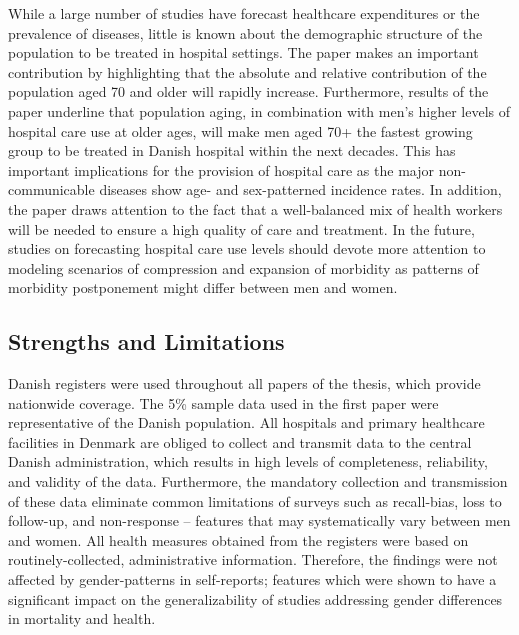 While a large number of studies have forecast healthcare expenditures 
or the prevalence of diseases, little is known about the demographic 
structure of the population to be treated in hospital settings. The 
paper makes an important contribution by highlighting that the absolute 
and relative contribution of the population aged 70 and older will 
rapidly increase. Furthermore, results of the paper underline that 
population aging, in combination with men's higher levels of hospital 
care use at older ages, will make men aged 70+ the fastest 
growing group to be treated in Danish hospital within the next decades. 
This has important implications for the provision of hospital care 
as the major non-communicable diseases show age- and sex-patterned 
incidence rates.\citep{campisi2013aging,leening2014sex,rasmussen2018absolute} 
In addition, the paper draws attention to the fact that a well-balanced 
mix of health workers will be needed to ensure a high quality of 
care and treatment.\citep{hughes2008medical,dall2013aging,darzi2016global,
wilson2018medical} In the future, studies on forecasting hospital care 
use levels should devote more attention to modeling scenarios of 
compression and expansion of morbidity as patterns of morbidity 
postponement might differ between men and women.\citep{fries2011compression}\\




\subsection{Strengths and Limitations}


Danish registers were used throughout all papers of the thesis, 
which provide nationwide coverage. The 5\% sample data used in 
the first paper were representative of the Danish population. All 
hospitals and primary healthcare facilities in Denmark are obliged 
to collect and transmit data to the central Danish administration, 
which results in high levels of completeness, reliability, and 
validity of the data.\citep{sahl2011danish,thygesen2014entire,
schmidt2015danish} Furthermore, the mandatory collection and 
transmission of these data eliminate common limitations of surveys 
such as recall-bias, loss to follow-up, and non-response\citep{thygesen2014entire} 
-- features that may systematically vary between men and women.\citep{vos2012does,
hunt2011women} All health measures obtained from the registers were 
based on routinely-collected, administrative information. Therefore, 
the findings were not affected by gender-patterns in self-reports; 
features which were shown to have a significant impact on the generalizability 
of studies addressing gender differences in mortality and health.\citep{oksuzyan2019story}

